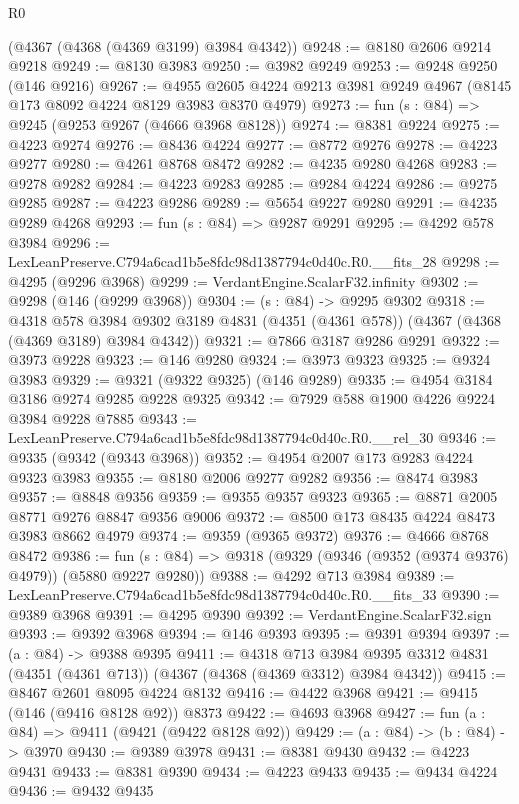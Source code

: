 \begin{lexlean}{R0}
\begin{coremodule}
    (@4367 (@4368 (@4369 @3199) @3984 @4342))
@9248 := @8180 @2606 @9214 @9218
@9249 := @8130 @3983
@9250 := @3982 @9249
@9253 := @9248 @9250 (@146 @9216)
@9267 := @4955 @2605 @4224 @9213 @3981 @9249 @4967 (@8145 @173 @8092 @4224 @8129 @3983 @8370 @4979)
@9273 := fun (s : @84) => @9245 (@9253 @9267 (@4666 @3968 @8128))
@9274 := @8381 @9224
@9275 := @4223 @9274
@9276 := @8436 @4224
@9277 := @8772 @9276
@9278 := @4223 @9277
@9280 := @4261 @8768 @8472
@9282 := @4235 @9280 @4268
@9283 := @9278 @9282
@9284 := @4223 @9283
@9285 := @9284 @4224
@9286 := @9275 @9285
@9287 := @4223 @9286
@9289 := @5654 @9227 @9280
@9291 := @4235 @9289 @4268
@9293 := fun (s : @84) => @9287 @9291
@9295 := @4292 @578 @3984
@9296 := LexLeanPreserve.C794a6cad1b5e8fdc98d1387794c0d40c.R0.__fits_28
@9298 := @4295 (@9296 @3968)
@9299 := VerdantEngine.ScalarF32.infinity
@9302 := @9298 (@146 (@9299 @3968))
@9304 := (s : @84) -> @9295 @9302
@9318 := @4318
    @578
    @3984
    @9302
    @3189
    @4831
    (@4351 (@4361 @578))
    (@4367 (@4368 (@4369 @3189) @3984 @4342))
@9321 := @7866 @3187 @9286 @9291
@9322 := @3973 @9228
@9323 := @146 @9280
@9324 := @3973 @9323
@9325 := @9324 @3983
@9329 := @9321 (@9322 @9325) (@146 @9289)
@9335 := @4954 @3184 @3186 @9274 @9285 @9228 @9325
@9342 := @7929 @588 @1900 @4226 @9224 @3984 @9228 @7885
@9343 := LexLeanPreserve.C794a6cad1b5e8fdc98d1387794c0d40c.R0.__rel_30
@9346 := @9335 (@9342 (@9343 @3968))
@9352 := @4954 @2007 @173 @9283 @4224 @9323 @3983
@9355 := @8180 @2006 @9277 @9282
@9356 := @8474 @3983
@9357 := @8848 @9356
@9359 := @9355 @9357 @9323
@9365 := @8871 @2005 @8771 @9276 @8847 @9356 @9006
@9372 := @8500 @173 @8435 @4224 @8473 @3983 @8662 @4979
@9374 := @9359 (@9365 @9372)
@9376 := @4666 @8768 @8472
@9386 := fun (s : @84) => @9318 (@9329 (@9346 (@9352 (@9374 @9376) @4979)) (@5880 @9227 @9280))
@9388 := @4292 @713 @3984
@9389 := LexLeanPreserve.C794a6cad1b5e8fdc98d1387794c0d40c.R0.__fits_33
@9390 := @9389 @3968
@9391 := @4295 @9390
@9392 := VerdantEngine.ScalarF32.sign
@9393 := @9392 @3968
@9394 := @146 @9393
@9395 := @9391 @9394
@9397 := (a : @84) -> @9388 @9395
@9411 := @4318
    @713
    @3984
    @9395
    @3312
    @4831
    (@4351 (@4361 @713))
    (@4367 (@4368 (@4369 @3312) @3984 @4342))
@9415 := @8467 @2601 @8095 @4224 @8132
@9416 := @4422 @3968
@9421 := @9415 (@146 (@9416 @8128 @92)) @8373
@9422 := @4693 @3968
@9427 := fun (a : @84) => @9411 (@9421 (@9422 @8128 @92))
@9429 := (a : @84) -> (b : @84) -> @3970
@9430 := @9389 @3978
@9431 := @8381 @9430
@9432 := @4223 @9431
@9433 := @8381 @9390
@9434 := @4223 @9433
@9435 := @9434 @4224
@9436 := @9432 @9435

\end{coremodule}
\end{lexlean}
